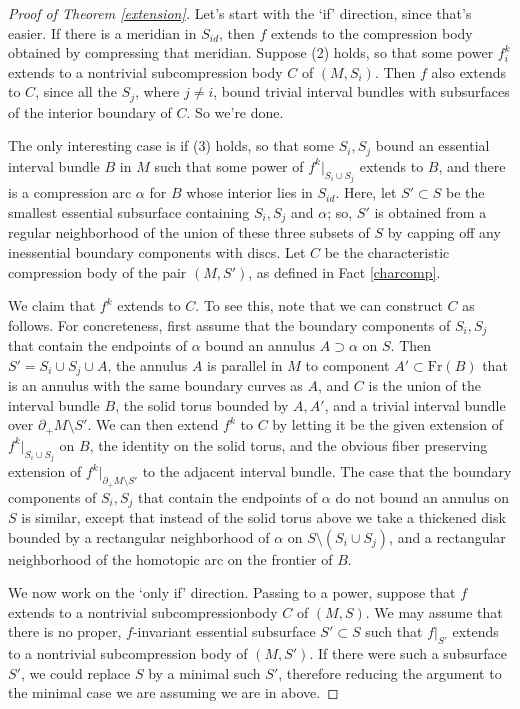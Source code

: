 \documentclass[12pt]{amsart}
\theoremstyle{definition}
\theoremstyle{remark}
\begin{document}
\begin{proof}[Proof of Theorem \ref{extension}]
	Let's start with the `if' direction, since that's easier. If there is a meridian in $S_{id}$, then $f$ extends to the compression body obtained by compressing that meridian. Suppose (2) holds, so that some power $f_i^k$ extends to a nontrivial subcompression body $C$ of $(M,S_i)$. Then $f$ also extends to $C$, since all the $S_j$, where $j\neq i$, bound trivial interval bundles with subsurfaces of the interior boundary of $C$. So we're done. 
	
	The only interesting case is if (3) holds, so that some $S_i,S_j$ bound an essential interval bundle $B$ in $M$ such that some power of $f^k|_{S_i \cup S_j}$ extends to $B$, and  there is a compression arc $\alpha$ for $B$ whose interior lies in $S_{id}$. Here, let $S' \subset S$ be the smallest essential subsurface containing $S_i,S_j$ and $\alpha$; so, $S'$ is obtained from a regular neighborhood of the union of these three subsets of $S$ by capping off any inessential boundary components with discs. Let $C$ be the characteristic compression body of the pair $(M,S')$, as defined in Fact \ref{charcomp}. 
	
	We claim that $f^k$ extends to $C$. To see this, note that we can construct $C$ as follows. For concreteness, first assume that the boundary components of $S_i,S_j$ that contain the endpoints of $\alpha$ bound an annulus $A \supset \alpha$ on $S$. Then $S'=S_i\cup S_j \cup A$, the annulus $A$ is parallel in $M$ to component $A'\subset \mathrm{Fr}(B)$ that is an annulus with the same boundary curves as $A$, and $C$ is the union of the interval bundle $B$, the solid torus bounded by $A,A'$, and a trivial interval bundle over $\partial_+ M \setminus S'$. We can then extend $f^k$ to $C$ by letting it be the given extension of $f^k|_{S_i\cup S_j}$ on $B$, the identity on the solid torus, and the obvious fiber preserving extension of $f^k |_{\partial_+ M \setminus S'}$ to the adjacent interval bundle. The case that the boundary components of $S_i,S_j$ that contain the endpoints of $\alpha$ do not bound an annulus on $S$ is similar, except that instead of the solid torus above we take a thickened disk bounded by a rectangular neighborhood of $\alpha$ on $S\setminus (S_i\cup S_j)$, and a rectangular neighborhood of the homotopic arc on the frontier of $B$. 
	
	\medskip
	
	
	
	
	
We now work on the `only if' direction. Passing to a power, suppose that $f$ extends to a nontrivial subcompressionbody $C $ of $(M,S)$. We may assume that there is no proper, $f$-invariant essential subsurface $S' \subset S$ such that $f|_{S'}$ extends to a nontrivial subcompression body of $(M,S')$. If there were such a subsurface $S'$, we could replace $S$ by a minimal such $S'$, therefore reducing the argument to the minimal case we are assuming we are in above.


\end{proof}
\end{document}
